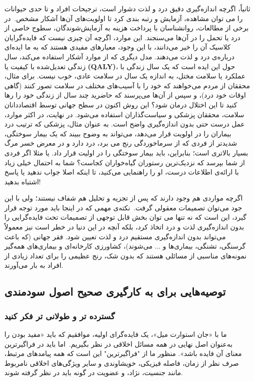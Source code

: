 ثانیاً، اگرچه اندازه‌گیری دقیق درد و لذت دشوار است، ترجیحات افراد و تا حدی حیوانات را می توان مشاهده، آزمایش و رتبه بندی کرد تا اولویت‌های آن‌ها آشکار مشخص.\     در برخی از مطالعات، روانشناسان با پرداخت هزینه به آزمایش‌شوندگان، سطوح خاصی از درد یا تحمل را در آن‌ها می‌سنجند.
این موارد، اگرچه آن چیزی نیست که فایده‌گرایان کلاسیک آن را خیر می‌دانند، با این وجود، معیارهای مفیدی هستند که به ما ایده‌ای درباره‌ی درد و لذت می‌دهند.
مدل دیگری که از موارد آشکار استفاده می‌کند، سال زندگی تعدیل‌شده با کیفیت یا \textenglish{\textbf{(QALY)}}، حول این ایده است که یک سال زندگی با عملکرد یا سلامت مختل، به اندازه یک سال در سلامت عادی، خوب نیست.
برای مثال، محققان از مردم می‌خواهند که خود را با آسیب‌های مختلف در سلامت تصور کنند (گاهی اوقات خود درد)، و سپس از آن‌ها می‌پرسند که حاضرید چند سال از زندگی خود را رها کنید تا این اختلال درمان شود؟ این روش اکنون در سطح جهانی توسط اقتصاددانان سلامت، محققان پزشکی و سیاست‌گذاران استفاده می‌شود.
در نهایت، در اکثر موارد، عمل درست حتی بدون اندازه‌گیری واضح است.
به عنوان مثال، پزشکی که ترتیب درد بیماران را در اولویت قرار می‌دهد، می‌تواند به وضوح ببیند که یک بیمار سوختگی، شدیدتر از فردی که از سرماخوردگی رنج می برد، درد دارد و در معرض خسر مرگ بسیار بالاتری است؛ بنابراین، باید بیمار سوختگی را در اولیت قرار داد.
یا مثلا اگر فردی از شما بپرسد که نزدیک‌ترین رستوران گیاه‌خواران کجاست؟ شما به احتمال خیلی زیاد با ارائه‌ی اطلاعات درست، او را راهنمایی می‌کنید، تا اینکه اصلا جواب ندهید یا پاسخ اشتباه بدهید!

اگرچه مواردی هم وجود دارند که پس از تجزیه و تحلیل هم شفاف نیستند؛ ولی با این جود می‌توان تصمیمات معقولی گرفت.\     نکته‌ی مهمی که در اینجا باید مورد توجه قرار گیرد، این است که نه تنها می توان بخش قابل توجهی از تصمیمات تحت فایده‌گرایی را بدون اندازه‌گیری لذت و درد اتخاذ کرد، بلکه آنچه در این دنیا در خطر است نیز معمولاً می‌تواند بدون اندازه‌گیری مستقیم درد و لذت تعیین شود.
فقر جهانی (که باعث گرسنگی، تشنگی، بیماری‌ها و ... می‌شوند)، کشاورزی کارخانه‌ای و بیماری‌های همه‌گیر نمونه‌های مناسبی از مسائلی هستند که بدون شک، رنج عظیمی را برای تعداد زیادی از افراد به بار می‌آورند.

\subsection*{توصیه‌هایی برای به کارگیری صحیح اصول سودمندی}
\label{subsec:توصیه‌هایی برای به کارگیری صحیح اصول سودمندی}


\subsubsection*{گسترده تر و طولانی تر فکر کنید}
\label{subsubsec:گسترده تر و طولانی تر فکر کنید}
ما با «جان استوارت میل»، یک فایده‌گرای اولیه، موافقیم که باید «مفید بودن را به‌عنوان اصل نهایی در همه مسائل اخلاقی در نظر بگیریم.\     اما باید در فراگیرترین معنای آن فایده باشد».
منظور ما از "فراگیرترین" این است که همه پیامدهای مرتبط، صرف نظر از زمان، فاصله فیزیکی، خویشاوندی و سایر ویژگی‌های اخلاقی نامربوط مانند جنسیت، نژاد، و عضویت در گونه باید در نظر گرفته شوند.

